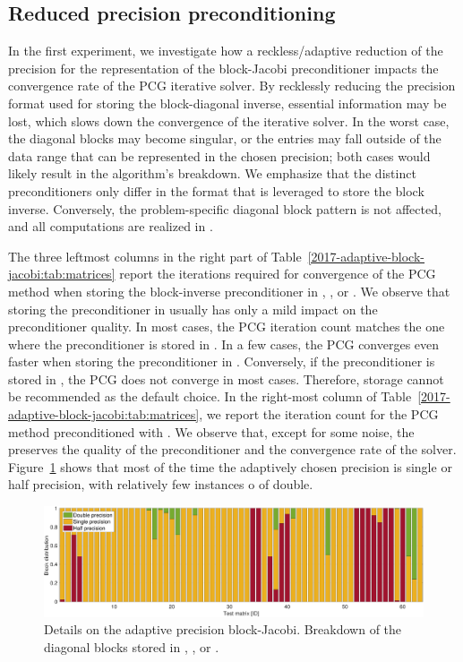 \subsection{Reduced precision preconditioning}

In the first experiment, we investigate how a reckless/adaptive reduction of the
precision for the representation of the block-Jacobi preconditioner impacts the
convergence rate of the PCG iterative solver. By recklessly reducing the
precision format used for storing the block-diagonal inverse, essential
information may be lost, which slows down the convergence of the
iterative solver. In the worst case, the diagonal blocks may become singular, or
the entries may fall outside of the data range that can be represented in the
chosen precision; both cases would likely result in the algorithm's breakdown. 
We
emphasize that the distinct preconditioners only differ in the format that is
leveraged to store the block inverse. Conversely, the problem-specific diagonal
block pattern is not affected, and
all computations are realized in \fpd.

The three leftmost columns in the right part of Table~\ref{2017-adaptive-block-jacobi:tab:matrices} report
the iterations required for convergence of  the PCG method when storing the
block-inverse preconditioner in \fpd, \fps, or \fph. We observe
that storing the preconditioner in \fps usually has only a mild impact on the
preconditioner quality. In most cases, the PCG iteration count matches the one
where the preconditioner is stored in \fpd. In a few cases, the PCG converges
even faster when storing the preconditioner in \fps. Conversely, if
the preconditioner is stored in \fph, the PCG does not converge in
most cases. Therefore, \fph storage cannot be recommended as the
default choice. In the right-most column of Table~\ref{2017-adaptive-block-jacobi:tab:matrices}, we
report the iteration count for the PCG method preconditioned with \apbj. We
observe that, except for some noise, the \apbj preserves the quality of the
preconditioner and the convergence rate of the \fpd solver.
Figure~\ref{2017-adaptive-block-jacobi:fig:blockinfo} shows that most of the time the adaptively
chosen precision is single or half precision, with relatively few instances
o of double.

\begin{figure}
\begin{center}
\includegraphics[width=\textwidth]{plots/blockinfo_adapt}
\caption{Details on the adaptive precision block-Jacobi. Breakdown of the 
diagonal blocks stored in \fpd, \fps, or \fph.}
\label{2017-adaptive-block-jacobi:fig:blockinfo}
\end{center}
\end{figure}

